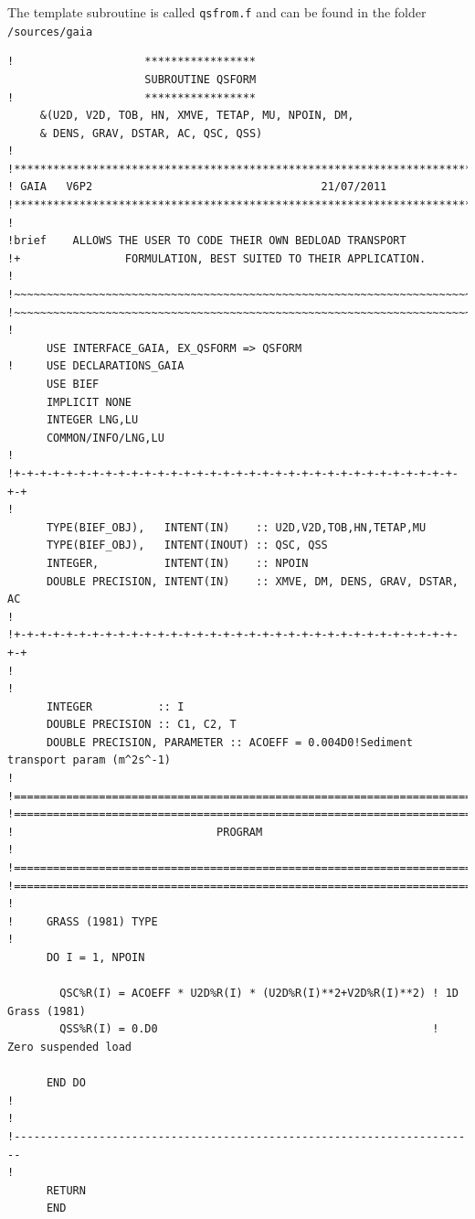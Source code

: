 {The template subroutine is called \texttt{qsfrom.f} and can be found in the folder \texttt{/sources/gaia}
\begin{lstlisting}[frame=trBL]
!                    *****************
                     SUBROUTINE QSFORM
!                    *****************
     &(U2D, V2D, TOB, HN, XMVE, TETAP, MU, NPOIN, DM,
     & DENS, GRAV, DSTAR, AC, QSC, QSS)
!
!***********************************************************************
! GAIA   V6P2                                   21/07/2011
!***********************************************************************
!
!brief    ALLOWS THE USER TO CODE THEIR OWN BEDLOAD TRANSPORT
!+                FORMULATION, BEST SUITED TO THEIR APPLICATION.
!
!~~~~~~~~~~~~~~~~~~~~~~~~~~~~~~~~~~~~~~~~~~~~~~~~~~~~~~~~~~~~~~~~~~~~~~~
!~~~~~~~~~~~~~~~~~~~~~~~~~~~~~~~~~~~~~~~~~~~~~~~~~~~~~~~~~~~~~~~~~~~~~~~
!
      USE INTERFACE_GAIA, EX_QSFORM => QSFORM
!     USE DECLARATIONS_GAIA
      USE BIEF
      IMPLICIT NONE
      INTEGER LNG,LU
      COMMON/INFO/LNG,LU
!
!+-+-+-+-+-+-+-+-+-+-+-+-+-+-+-+-+-+-+-+-+-+-+-+-+-+-+-+-+-+-+-+-+-+-+-+
!
      TYPE(BIEF_OBJ),   INTENT(IN)    :: U2D,V2D,TOB,HN,TETAP,MU
      TYPE(BIEF_OBJ),   INTENT(INOUT) :: QSC, QSS
      INTEGER,          INTENT(IN)    :: NPOIN
      DOUBLE PRECISION, INTENT(IN)    :: XMVE, DM, DENS, GRAV, DSTAR, AC
!
!+-+-+-+-+-+-+-+-+-+-+-+-+-+-+-+-+-+-+-+-+-+-+-+-+-+-+-+-+-+-+-+-+-+-+-+
!
!
      INTEGER          :: I
      DOUBLE PRECISION :: C1, C2, T
      DOUBLE PRECISION, PARAMETER :: ACOEFF = 0.004D0!Sediment transport param (m^2s^-1)
!
!======================================================================!
!======================================================================!
!                               PROGRAM                                !
!======================================================================!
!======================================================================!
!
!     GRASS (1981) TYPE
!
      DO I = 1, NPOIN

        QSC%R(I) = ACOEFF * U2D%R(I) * (U2D%R(I)**2+V2D%R(I)**2) ! 1D Grass (1981)
        QSS%R(I) = 0.D0                                          ! Zero suspended load

      END DO
!
!
!-----------------------------------------------------------------------
!
      RETURN
      END
\end{lstlisting}


}
